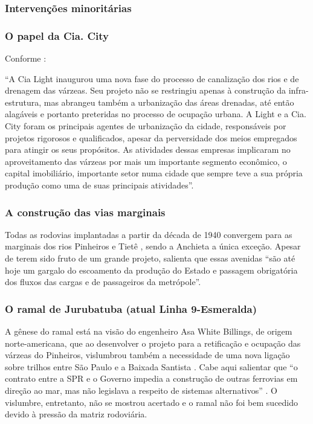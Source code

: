 \documentclass[
article,			%
11pt,				%
oneside,			%
a4paper,			%
english,			%
brazil,				%
sumario=tradicional
]{abntex2}
\begin{document}
	\subsubsection{Intervenções minoritárias} \label{s3:minoritariaspinheiros}
	
	\subsubsection{O papel da Cia. City} \label{s3:ciacity}
	
	Conforme :
	
	\begin{citacao}
		``A Cia Light inaugurou uma nova fase do processo de canalização dos rios e de drenagem das várzeas. Seu projeto não se restringiu apenas à construção da infra-estrutura, mas abrangeu também a urbanização das áreas drenadas, até então alagáveis e portanto preteridas no processo de ocupação urbana. A Light e a Cia. City foram os principais agentes de urbanização da cidade, responsáveis por projetos rigorosos e qualificados, apesar da perversidade dos meios empregados para atingir os seus propósitos. As atividades dessas empresas implicaram no aproveitamento das várzeas por mais um importante segmento econômico, o capital imobiliário, importante setor numa cidade que sempre teve a sua própria produção como uma de suas principais atividades''.
	\end{citacao}
	
	\subsubsection{A construção das vias marginais} \label{s3:construindo}
	
	Todas as rodovias implantadas a partir da década de 1940 convergem para as marginais dos rios Pinheiros e Tietê \cite[p. 12]{franco2005a}, sendo a Anchieta a única exceção. Apesar de terem sido fruto de um grande projeto,  salienta que essas avenidas ``são até hoje um gargalo do escoamento da produção do Estado e passagem obrigatória dos fluxos das cargas e de passageiros da metrópole''.
	
	\subsubsection{O ramal de Jurubatuba (atual Linha 9-Esmeralda)} \label{s3:linha9}
	
	A gênese do ramal está na visão do engenheiro Asa White Billings, de origem norte-americana, que ao desenvolver o projeto para a retificação e ocupação das várzeas do Pinheiros, vislumbrou também a necessidade de uma nova ligação sobre trilhos entre São Paulo e a Baixada Santista \cite[p. 61]{franco2005a}. Cabe aqui salientar que ``o contrato entre a SPR e o Governo impedia a construção de outras ferrovias em direção ao mar, mas não legislava a respeito de sistemas alternativos'' \cite[p. 61]{franco2005a}. O vislumbre, entretanto, não se mostrou acertado e o ramal não foi bem sucedido devido à pressão da matriz rodoviária.
	
\end{document}
